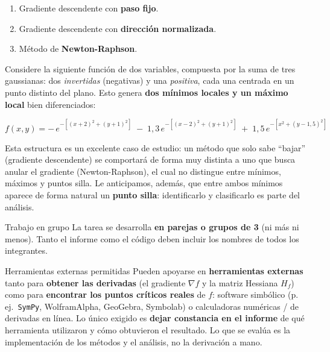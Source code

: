 \documentclass[12pt,a4paper]{article}
\begin{document}
\begin{enumerate}[label=\arabic*., leftmargin=*, topsep=2pt]
    \item Gradiente descendente con \textbf{paso fijo}.
    \item Gradiente descendente con \textbf{dirección normalizada}.
    \item Método de \textbf{Newton-Raphson}.
\end{enumerate}

Considere la siguiente función de dos variables, compuesta por la suma de
tres gaussianas: dos \emph{invertidas} (negativas) y una \emph{positiva}, cada
una centrada en un punto distinto del plano. Esto genera \textbf{dos mínimos
locales y un máximo local} bien diferenciados:

\begin{equation*}
    f(x, y) = -\,e^{-\left[(x+2)^2+(y+1)^2\right]}
              \;-\; 1{,}3\,e^{-\left[(x-2)^2+(y+1)^2\right]}
              \;+\; 1{,}5\,e^{-\left[x^2+(y-1{,}5)^2\right]}
\end{equation*}

Esta estructura es un excelente caso de estudio: un método que solo sabe
``bajar'' (gradiente descendente) se comportará de forma muy distinta a uno
que busca anular el gradiente (Newton-Raphson), el cual no distingue entre
mínimos, máximos y puntos silla. Le anticipamos, además, que entre ambos
mínimos aparece de forma natural un \textbf{punto silla}: identificarlo y
clasificarlo es parte del análisis.

\begin{ayuda}{Trabajo en grupo}
\vspace{2pt}
La tarea se desarrolla \textbf{en parejas o grupos de 3} (ni más ni menos).
Tanto el informe como el código deben incluir los nombres de todos los
integrantes.
\end{ayuda}

\begin{ayuda}{Herramientas externas permitidas}
\vspace{2pt}
Pueden apoyarse en \textbf{herramientas externas} tanto para \textbf{obtener las
derivadas} (el gradiente $\nabla f$ y la matriz Hessiana $H_f$) como para
\textbf{encontrar los puntos críticos reales} de $f$: software simbólico
(p.\,ej.\ \texttt{SymPy}, WolframAlpha, GeoGebra, Symbolab) o calculadoras
numéricas / de derivadas en línea. Lo único exigido es \textbf{dejar constancia
en el informe} de qué herramienta utilizaron y cómo obtuvieron el resultado.
Lo que se evalúa es la implementación de los métodos y el análisis, no la
derivación a mano.
\end{ayuda}
\end{document}
